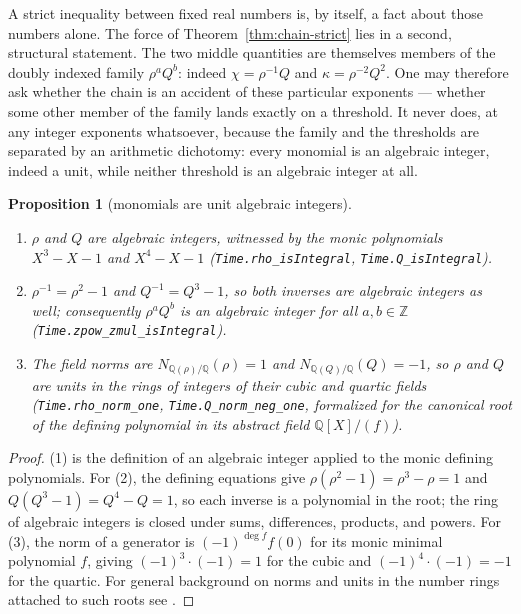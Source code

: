 \documentclass[11pt]{amsart}
\theoremstyle{plain}
\newtheorem{proposition}[theorem]{Proposition}
\theoremstyle{definition}
\theoremstyle{remark}
\begin{document}
A strict inequality between fixed real numbers is, by itself, a fact about those numbers alone. The force of Theorem~\ref{thm:chain-strict} lies in a second, structural statement. The two middle quantities are themselves members of the doubly indexed family $\rho^a Q^b$: indeed $\chi = \rho^{-1} Q$ and $\kappa = \rho^{-2} Q^2$. One may therefore ask whether the chain is an accident of these particular exponents --- whether some other member of the family lands exactly on a threshold. It never does, at any integer exponents whatsoever, because the family and the thresholds are separated by an arithmetic dichotomy: every monomial is an algebraic integer, indeed a unit, while neither threshold is an algebraic integer at all.

\begin{proposition}[monomials are unit algebraic integers]\label{prop:unit-monomials}
\leavevmode
\begin{enumerate}
\item $\rho$ and $Q$ are algebraic integers, witnessed by the monic polynomials $X^3 - X - 1$ and $X^4 - X - 1$ \textup{(\texttt{Time.rho\_isIntegral}, \texttt{Time.Q\_isIntegral})}.
\item $\rho^{-1} = \rho^2 - 1$ and $Q^{-1} = Q^3 - 1$, so both inverses are algebraic integers as well; consequently $\rho^a Q^b$ is an algebraic integer for all $a, b \in \mathbb{Z}$ \textup{(\texttt{Time.zpow\_zmul\_isIntegral})}.
\item The field norms are $N_{\mathbb{Q}(\rho)/\mathbb{Q}}(\rho) = 1$ and $N_{\mathbb{Q}(Q)/\mathbb{Q}}(Q) = -1$, so $\rho$ and $Q$ are units in the rings of integers of their cubic and quartic fields \textup{(\texttt{Time.rho\_norm\_one}, \texttt{Time.Q\_norm\_neg\_one}, formalized for the canonical root of the defining polynomial in its abstract field $\mathbb{Q}[X]/(f)$)}.
\end{enumerate}
\end{proposition}

\begin{proof}
(1) is the definition of an algebraic integer applied to the monic defining polynomials. For (2), the defining equations give $\rho(\rho^2 - 1) = \rho^3 - \rho = 1$ and $Q(Q^3 - 1) = Q^4 - Q = 1$, so each inverse is a polynomial in the root; the ring of algebraic integers is closed under sums, differences, products, and powers. For (3), the norm of a generator is $(-1)^{\deg f} f(0)$ for its monic minimal polynomial $f$, giving $(-1)^3 \cdot (-1) = 1$ for the cubic and $(-1)^4 \cdot (-1) = -1$ for the quartic. For general background on norms and units in the number rings attached to such roots see \cite{bertin1992}.
\end{proof}
\end{document}
